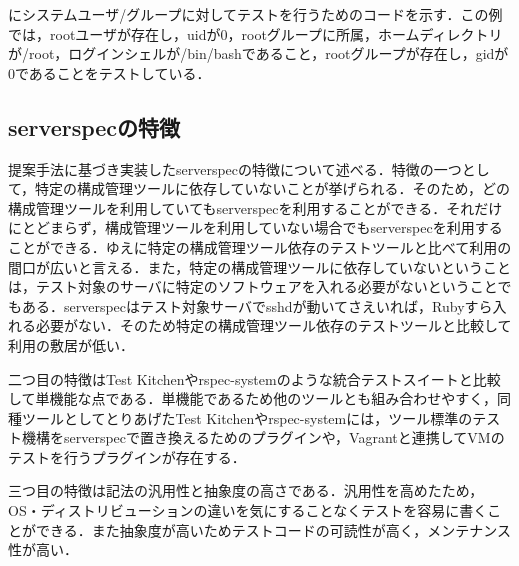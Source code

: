 にシステムユーザ/グループに対してテストを行うためのコードを示す．この例では，rootユーザが存在し，uidが0，rootグループに所属，ホームディレクトリが/root，ログインシェルが/bin/bashであること，rootグループが存在し，gidが0であることをテストしている．

\subsection{serverspecの特徴}

提案手法に基づき実装したserverspecの特徴について述べる．特徴の一つとして，特定の構成管理ツールに依存していないことが挙げられる．そのため，どの構成管理ツールを利用していてもserverspecを利用することができる．それだけにとどまらず，構成管理ツールを利用していない場合でもserverspecを利用することができる．ゆえに特定の構成管理ツール依存のテストツールと比べて利用の間口が広いと言える．また，特定の構成管理ツールに依存していないということは，テスト対象のサーバに特定のソフトウェアを入れる必要がないということでもある．serverspecはテスト対象サーバでsshdが動いてさえいれば，Rubyすら入れる必要がない．そのため特定の構成管理ツール依存のテストツールと比較して利用の敷居が低い．

二つ目の特徴はTest Kitchenやrspec-systemのような統合テストスイートと比較して単機能な点である．単機能であるため他のツールとも組み合わせやすく，同種ツールとしてとりあげたTest Kitchenやrspec-systemには，ツール標準のテスト機構をserverspecで置き換えるためのプラグインや，Vagrant\cite{vagrant}と連携してVMのテストを行うプラグインが存在する．

三つ目の特徴は記法の汎用性と抽象度の高さである．汎用性を高めたため，OS・ディストリビューションの違いを気にすることなくテストを容易に書くことができる．また抽象度が高いためテストコードの可読性が高く，メンテナンス性が高い．
